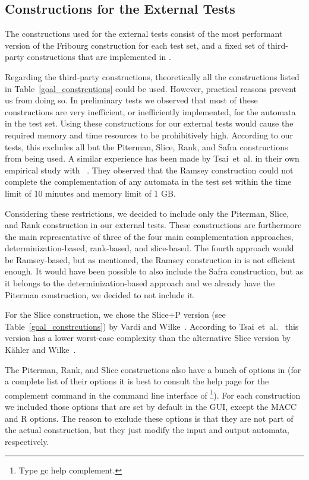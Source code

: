 \subsection{Constructions for the External Tests}
The constructions used for the external tests consist of the most performant version of the Fribourg construction for each test set, and a fixed set of third-party constructions that are implemented in \goal.

Regarding the third-party constructions, theoretically all the constructions listed in Table~\ref{goal_constrcutions} could be used. However, practical reasons prevent us from doing so. In preliminary tests we observed that most of these constructions are very inefficient, or inefficiently implemented, for the automata in the \goal{} test set. Using these constructions for our external tests would cause the required memory and time resources to be prohibitively high. According to our tests, this excludes all but the Piterman, Slice, Rank, and Safra constructions from being used. A similar experience has been made by Tsai~et~al. in their own empirical study with \goal~\cite{2011_tsai}. They observed that the Ramsey construction could not complete the complementation of any automata in the \goal{} test set within the time limit of 10 minutes and memory limit of 1 GB.

Considering these restrictions, we decided to include only the Piterman, Slice, and Rank construction in our external tests. These constructions are furthermore the main representative of three of the four main complementation approaches, determinization-based, rank-based, and slice-based. The fourth approach would be Ramsey-based, but as mentioned, the Ramsey construction in \goal{} is not efficient enough. It would have been possible to also include the Safra construction, but as it belongs to the determinization-based approach and we already have the Piterman construction, we decided to not include it.

For the Slice construction, we chose the Slice+P version (see Table~\ref{goal_constrcutions}) by Vardi and Wilke~\cite{vardi2007automata}. According to Tsai~et~al.~\cite{2011_tsai} this version has a lower worst-case complexity than the alternative Slice version by Kähler and Wilke~\cite{2008_kaehler}.

The Piterman, Rank, and Slice constructions also have a bunch of options in \goal (for a complete list of their options it is best to consult the help page for the \textsf{complement} command in the command line interface of \goal\footnote{Type \textsf{gc help complement}.}). For each construction we included those options that are set by default in the \goal{} GUI, except the MACC and R options. The reason to exclude these options is that they are not part of the actual construction, but they just modify the input and output automata, respectively.


